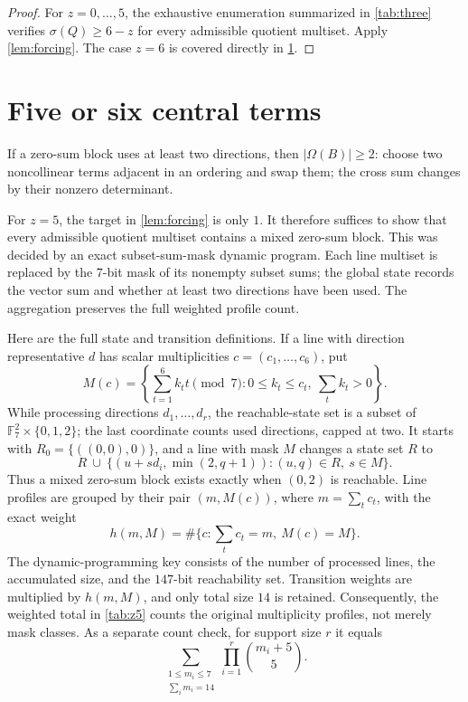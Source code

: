 \documentclass[11pt]{amsart}
\theoremstyle{definition}
\newcommand{\F}{\mathbb F}
\newcommand{\Om}{\Omega}
\begin{document}
\begin{proof}
For $z=0,\ldots,5$, the exhaustive enumeration summarized in \cref{tab:three} verifies $\sigma(Q)\geq6-z$ for every admissible quotient multiset. Apply \cref{lem:forcing}. The case $z=6$ is covered directly in \cref{sec:highz}.
\end{proof}

\section{Five or six central terms}\label{sec:highz}

If a zero-sum block uses at least two directions, then $|\Om(B)|\geq2$: choose two noncollinear terms adjacent in an ordering and swap them; the cross sum changes by their nonzero determinant.

For $z=5$, the target in \cref{lem:forcing} is only $1$. It therefore suffices to show that every admissible quotient multiset contains a mixed zero-sum block. This was decided by an exact subset-sum-mask dynamic program. Each line multiset is replaced by the $7$-bit mask of its nonempty subset sums; the global state records the vector sum and whether at least two directions have been used. The aggregation preserves the full weighted profile count.

Here are the full state and transition definitions.  If a line with
direction representative $d$ has scalar multiplicities
$c=(c_1,\ldots,c_6)$, put
\[
M(c)=\left\{\sum_{t=1}^6 k_tt\pmod 7:
0\leq k_t\leq c_t,\ \sum_tk_t>0\right\}.
\]
While processing directions $d_1,\ldots,d_r$, the reachable-state set
is a subset of $\F_7^2\times\{0,1,2\}$; the last coordinate counts used
directions, capped at two.  It starts with
$R_0=\{((0,0),0)\}$, and a line with mask
$M$ changes a state set $R$ to
\[
R\ \cup\ \{(u+s d_i,\min(2,q+1)):(u,q)\in R,\ s\in M\}.
\]
Thus a mixed zero-sum block exists exactly when $(0,2)$ is reachable.
Line profiles are grouped by their pair $(m,M(c))$, where
$m=\sum_t c_t$, with the exact weight
\[
h(m,M)=\#\{c:\textstyle\sum_t c_t=m,\ M(c)=M\}.
\]
The dynamic-programming key consists of the number of processed lines,
the accumulated size, and the $147$-bit reachability set.  Transition
weights are multiplied by $h(m,M)$, and only total size $14$ is retained.
Consequently, the weighted total in \cref{tab:z5} counts the original
multiplicity profiles, not merely mask classes.  As a separate count
check, for support size $r$ it equals
\[
\sum_{\substack{1\leq m_i\leq7\\\sum_i m_i=14}}
 \prod_{i=1}^r \binom{m_i+5}{5}.
\]
\end{document}
